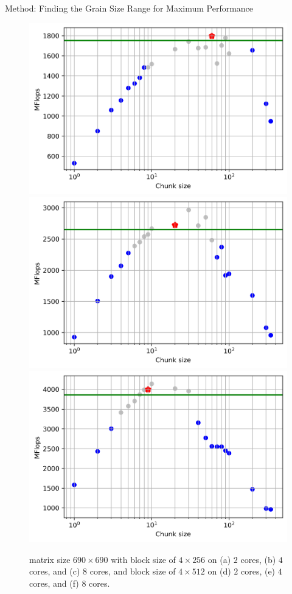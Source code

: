 \documentclass[10pt]{beamer}
\begin{document}
\begin{frame}{Method: Finding the Grain Size Range for Maximum Performance}
\begin{outline}
\begin{figure}[H]
	{\includegraphics[scale=.25]{images/polyfit/fig_690_chunks_2_4-512.png}\label{fig14:d}}
	{\includegraphics[scale=.25]{images/polyfit/fig_690_chunks_4_4-512.png}\label{fig14:e}}
	{\includegraphics[scale=.25]{images/polyfit/fig_690_chunks_8_4-512.png}\label{fig14:f}}
	\caption{matrix size $690\times690$ with block size of $4\times256$ on (a) $2$ cores, (b) $4$ cores, and (c) $8$ cores, and block size of $4\times512$ on (d) $2$ cores, (e) $4$ cores, and (f) $8$ cores. }	
	\label{fig14}
\end{figure}
\end{outline}
\end{frame}
\end{document}
